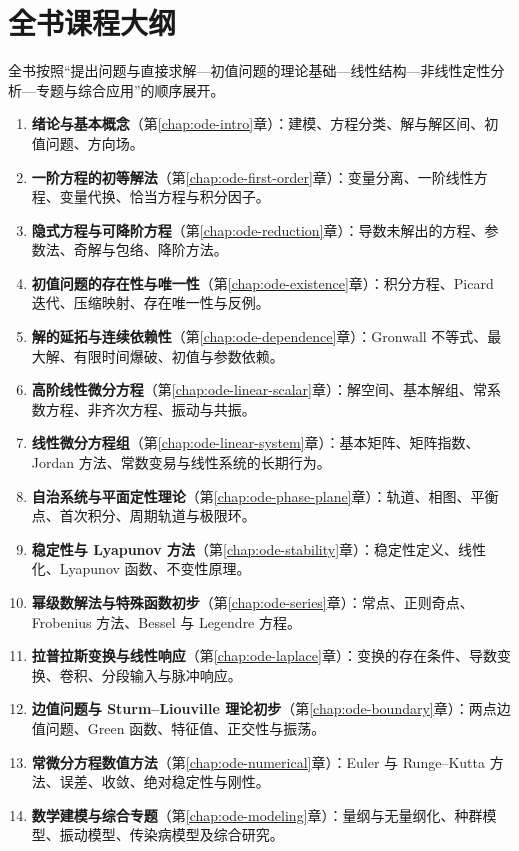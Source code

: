 \section*{全书课程大纲}
全书按照“提出问题与直接求解---初值问题的理论基础---线性结构---非线性定性分析---专题与综合应用”的顺序展开。
\begin{enumerate}
  \item \textbf{绪论与基本概念}（第\ref{chap:ode-intro}章）：建模、方程分类、解与解区间、初值问题、方向场。
  \item \textbf{一阶方程的初等解法}（第\ref{chap:ode-first-order}章）：变量分离、一阶线性方程、变量代换、恰当方程与积分因子。
  \item \textbf{隐式方程与可降阶方程}（第\ref{chap:ode-reduction}章）：导数未解出的方程、参数法、奇解与包络、降阶方法。
  \item \textbf{初值问题的存在性与唯一性}（第\ref{chap:ode-existence}章）：积分方程、Picard 迭代、压缩映射、存在唯一性与反例。
  \item \textbf{解的延拓与连续依赖性}（第\ref{chap:ode-dependence}章）：Gronwall 不等式、最大解、有限时间爆破、初值与参数依赖。
  \item \textbf{高阶线性微分方程}（第\ref{chap:ode-linear-scalar}章）：解空间、基本解组、常系数方程、非齐次方程、振动与共振。
  \item \textbf{线性微分方程组}（第\ref{chap:ode-linear-system}章）：基本矩阵、矩阵指数、Jordan 方法、常数变易与线性系统的长期行为。
  \item \textbf{自治系统与平面定性理论}（第\ref{chap:ode-phase-plane}章）：轨道、相图、平衡点、首次积分、周期轨道与极限环。
  \item \textbf{稳定性与 Lyapunov 方法}（第\ref{chap:ode-stability}章）：稳定性定义、线性化、Lyapunov 函数、不变性原理。
  \item \textbf{幂级数解法与特殊函数初步}（第\ref{chap:ode-series}章）：常点、正则奇点、Frobenius 方法、Bessel 与 Legendre 方程。
  \item \textbf{拉普拉斯变换与线性响应}（第\ref{chap:ode-laplace}章）：变换的存在条件、导数变换、卷积、分段输入与脉冲响应。
  \item \textbf{边值问题与 Sturm--Liouville 理论初步}（第\ref{chap:ode-boundary}章）：两点边值问题、Green 函数、特征值、正交性与振荡。
  \item \textbf{常微分方程数值方法}（第\ref{chap:ode-numerical}章）：Euler 与 Runge--Kutta 方法、误差、收敛、绝对稳定性与刚性。
  \item \textbf{数学建模与综合专题}（第\ref{chap:ode-modeling}章）：量纲与无量纲化、种群模型、振动模型、传染病模型及综合研究。
\end{enumerate}

